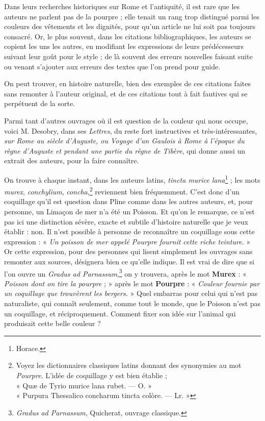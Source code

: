 \documentclass[a4paper, 11pt, oneside, polutonikogreek, french]{article}
\begin{document}
Dans leurs recherches historiques sur Rome et l'antiquité, il est rare que les auteurs ne parlent pas de la pourpre ; elle tenait un rang trop distingué parmi les couleurs des vêtements et les dignités, pour qu'un article ne lui soit pas toujours consacré. Or, le plus souvent, dans les citations bibliographiques, les auteurs se copient les uns les autres, en modifiant les expressions de leurs prédécesseurs suivant leur goût pour le style ; de là souvent des erreurs nouvelles faisant suite ou venant s'ajouter aux erreurs des textes que l'on prend pour guide.

On peut trouver, en histoire naturelle, bien des exemples de ces citations faites sans remonter à l'auteur original, et de ces citations tout à fait fautives qui se perpétuent de la sorte.

Parmi tant d'autres ouvrages où il est question de la couleur qui nous occupe, voici M. Desobry, dans ses \emph{Lettres}, du reste fort instructives et très-intéressantes, \emph{sur Rome au siècle d'Auguste, ou Voyage d'un Gaulois à Rome à l'époque du règne d'Auguste et pendant une partie du règne de Tibère}, qui donne aussi un extrait des auteurs, pour la faire connaître.

On trouve à chaque instant, dans les auteurs latins, \emph{tincta murice lana}\footnote{Horace.} ; les mots \emph{murex}, \emph{conchylium}, \emph{concha},\footnote{Voyez les dictionnaires classiques latins donnant des synonymies au mot \emph{Pourpre}. L'idée de coquillage y est bien établie ;\\\hspace*{5mm}« Quæ de Tyrio murice lana rubet. --- O. »\\\hspace*{5mm}« Purpura Thessalico concharum tincta colòre. --- Lr. »} reviennent bien fréquemment. C'est donc d'un coquillage qu'il est question dans Pline comme dans les autres auteurs, et, pour personne, un Limaçon de mer n'a été un Poisson. Et qu'on le remarque, ce n'est pas ici une distinction sévère, exacte et subtile d'histoire naturelle que je veux établir : non. Il n'est possible à personne de reconnaître un coquillage sous cette expression : « \emph{Un poisson de mer appelé Pourpre fournit cette riche teinture.} » Or cette expression, pour des personnes qui lisent simplement les ouvrages sans remonter aux sources, désignera bien ce qu'elle indique. Il est vrai de dire que si l'on ouvre un \emph{Gradus ad Parnassum},\footnote{\emph{Gradus ad Parnassum}, Quicherat, ouvrage classique.} on y trouvera, après le mot \textbf{Murex} : « \emph{Poisson dont on tire la pourpre} ; » après le mot \textbf{Pourpre} : « \emph{Couleur fournie par un coquillage que trouvèrent les bergers.} » Quel embarras pour celui qui n'est pas naturaliste, qui connaît seulement, comme tout le monde, que le Poisson n'est pas un coquillage, et réciproquement. Comment fixer son idée sur l'animal qui produisait cette belle couleur ?
\end{document}
